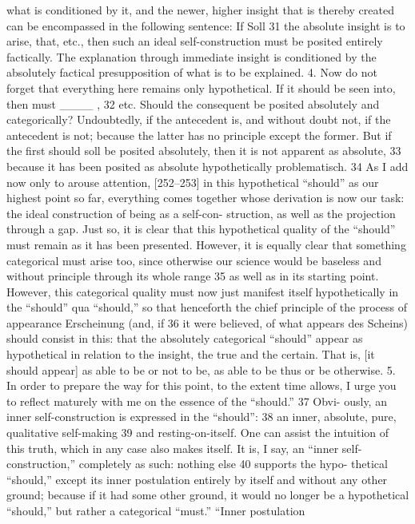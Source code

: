 what is conditioned by it, and the newer, higher insight that is thereby created
can be encompassed in the following sentence: If {Soll} 31 the absolute insight
is to arise, that, etc., then such an ideal self-construction must be posited
entirely factically. The explanation through immediate insight is conditioned
by the absolutely factical presupposition of what is to be explained.
4. Now do not forget that everything here remains only hypothetical. If
it should be seen into, then must ____ , 32 etc. Should the consequent be posited
absolutely and categorically? Undoubtedly, if the antecedent is, and without
doubt not, if the antecedent is not; because the latter has no principle except
the former. But if the first should {soll} be posited absolutely, then it is not
apparent as absolute, 33 because it has been posited as absolute hypothetically
{problematisch}. 34 As I add now only to arouse attention, [252–253] in this
hypothetical “should” as our highest point so far, everything comes together
whose derivation is now our task: the ideal construction of being as a self-con-
struction, as well as the projection through a gap. Just so, it is clear that this
hypothetical quality of the “should” must remain as it has been presented.
However, it is equally clear that something categorical must arise too, since
otherwise our science would be baseless and without principle through its
whole range 35 as well as in its starting point. However, this categorical quality
must now just manifest itself hypothetically in the “should” qua “should,” so
that henceforth the chief principle of the process of appearance {Erscheinung}
(and, if 36 it were believed, of what appears {des Scheins}) should consist in this:
that the absolutely categorical “should” appear as hypothetical in relation to
the insight, the true and the certain. That is, [it should appear] as able to be
or not to be, as able to be thus or be otherwise.
5. In order to prepare the way for this point, to the extent time allows,
I urge you to reflect maturely with me on the essence of the “should.” 37 Obvi-
ously, an inner self-construction is expressed in the “should”: 38 an inner,
absolute, pure, qualitative self-making 39 and resting-on-itself. One can assist
the intuition of this truth, which in any case also makes itself. It is, I say, an
“inner self-construction,” completely as such: nothing else 40 supports the hypo-
thetical “should,” except its inner postulation entirely by itself and without any
other ground; because if it had some other ground, it would no longer be a
hypothetical “should,” but rather a categorical “must.” “Inner postulation

